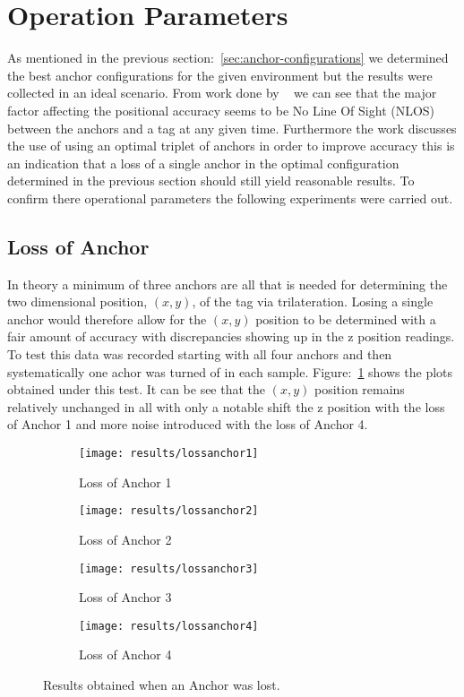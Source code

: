 \section{Operation Parameters}\label{sec:op-params}
As mentioned in the previous section:~\ref{sec:anchor-configurations} we determined the best anchor configurations for the given environment but the results were collected in an ideal scenario.
From work done by ~\citet{evaluwb} we can see that the major factor affecting the positional accuracy seems to be No Line Of Sight (NLOS) between the anchors and a tag at any given time.
Furthermore the work discusses the use of using an optimal triplet of anchors in order to improve accuracy this is an indication that a loss of a single anchor in the optimal configuration determined in the previous section should still yield reasonable results.
To confirm there operational parameters the following experiments were carried out.

\subsection*{Loss of Anchor}
In theory a minimum of three anchors are all that is needed for determining the two dimensional position, $(x,y)$, of the tag via trilateration.
Losing a single anchor would therefore allow for the $(x,y)$ position to be determined with a fair amount of accuracy with discrepancies showing up in the z position readings.
To test this data was recorded starting with all four anchors and then systematically one achor was turned of in each sample.
Figure:~\ref{fig:Loss_anchors} shows the plots obtained under this test.
It can be see that the $(x,y)$ position remains relatively unchanged in all with only a notable shift the z position with the loss of Anchor 1 and more noise introduced with the loss of Anchor 4.

\begin{figure}[h!]
    \centering
    \begin{subfigure}{0.45\textwidth}
            \texttt{[image: results/lossanchor1]}
            \caption{Loss of Anchor 1}
    \end{subfigure}
    \begin{subfigure}{0.45\textwidth}
            \texttt{[image: results/lossanchor2]}
            \caption{Loss of Anchor 2}
    \end{subfigure}

    \begin{subfigure}{0.45\textwidth}
            \texttt{[image: results/lossanchor3]}
            \caption{Loss of Anchor 3}
    \end{subfigure}
    \begin{subfigure}{0.45\textwidth}
            \texttt{[image: results/lossanchor4]}
            \caption{Loss of Anchor 4}
    \end{subfigure}
    \caption{Results obtained when an Anchor was lost.}
    \label{fig:Loss_anchors}
\end{figure}
\newpage
